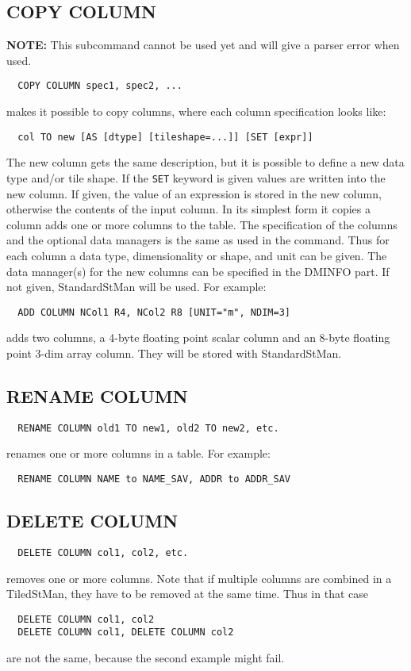 \subsection{COPY COLUMN}
{\bf NOTE:} This subcommand cannot be used yet and will give a parser
error when used.
\begin{verbatim}
  COPY COLUMN spec1, spec2, ...
\end{verbatim}
makes it possible to copy columns, where each column specification
looks like:
\begin{verbatim}
  col TO new [AS [dtype] [tileshape=...]] [SET [expr]]
\end{verbatim}
The new column gets the same description, but it is possible to define
a new data type and/or tile shape. If the \texttt{SET} keyword is
given values are written into the new column. If given, the value of an expression is
stored in the new column, otherwise the contents of the input column.
In its simplest form it copies a column
adds one or more columns to the table.
The specification of the columns and the optional data managers is the
same as used in the
 command. Thus for each column
a data type, dimensionality or shape, and unit  can be given.
The data manager(s) for the new columns can be specified in the DMINFO
part. If not given, StandardStMan will be used.
For example:
\begin{verbatim}
  ADD COLUMN NCol1 R4, NCol2 R8 [UNIT="m", NDIM=3]
\end{verbatim}
adds two columns, a 4-byte floating point scalar column and an 8-byte
floating point 3-dim array column. They will be stored with StandardStMan.

\subsection{RENAME COLUMN}
\begin{verbatim}
  RENAME COLUMN old1 TO new1, old2 TO new2, etc.
\end{verbatim}
renames one or more columns in a table.
For example:
\begin{verbatim}
  RENAME COLUMN NAME to NAME_SAV, ADDR to ADDR_SAV
\end{verbatim}

\subsection{DELETE COLUMN}
\begin{verbatim}
  DELETE COLUMN col1, col2, etc.
\end{verbatim}
removes one or more columns.
Note that if multiple columns are combined in a TiledStMan, they have
to be removed at the same time. Thus in that case
\begin{verbatim}
  DELETE COLUMN col1, col2
  DELETE COLUMN col1, DELETE COLUMN col2
\end{verbatim}
are not the same, because the second example might fail.

